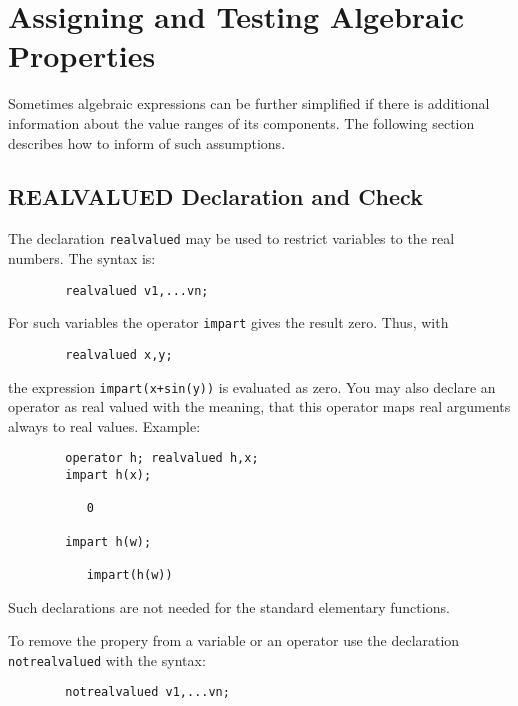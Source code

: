 \chapter{Assigning and Testing Algebraic Properties}

Sometimes algebraic expressions can be further simplified if
there is additional information about the value ranges
of its components. The following section describes 
how to inform {\REDUCE} of such assumptions.


\section{REALVALUED Declaration and Check}
\hypertarget{command:REALVALUED}{}
\hypertarget{command:NOTREALVALUED}{}

The declaration \texttt{realvalued}%
may be used 
to restrict variables to the real numbers. The syntax is:
\begin{verbatim}
        realvalued v1,...vn;
\end{verbatim}
For such variables the operator \texttt{impart} gives 
the result zero. Thus, with
\begin{verbatim}
        realvalued x,y;
\end{verbatim}
the expression \texttt{impart(x+sin(y))} is evaluated as zero.
You may also declare an operator as real valued
with the meaning, that this operator maps real arguments always to
real values. Example:
\begin{verbatim}
        operator h; realvalued h,x;
        impart h(x);
   
           0
  
        impart h(w);

           impart(h(w))
\end{verbatim}
Such declarations are not needed for the standard elementary functions.
        
To remove the propery from a variable or an operator use the declaration
\texttt{notrealvalued}
with the syntax:
\begin{verbatim}
        notrealvalued v1,...vn;
\end{verbatim}

